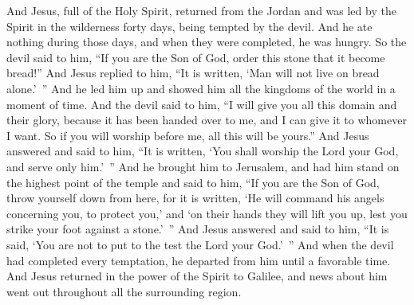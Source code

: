 \begin{biblechapter} %
 And Jesus, full of the Holy Spirit, returned from the Jordan and was led by the Spirit in the wilderness
\verse forty days, being tempted by the devil. And he ate nothing during those days, and when they were completed, he was hungry.
\verse So the devil said to him, “If you are the Son of God, order this stone that it become bread!”
\verse And Jesus replied to him, “It is written, ‘Man will not live on bread alone.’ ”
\verse And he led him up and showed him all the kingdoms of the world in a moment of time.
\verse And the devil said to him, “I will give you all this domain and their glory, because it has been handed over to me, and I can give it to whomever I want.
\verse So if you will worship before me, all this will be yours.”
\verse And Jesus answered and said to him, “It is written, ‘You shall worship the Lord your God, and serve only him.’ ”
\verse And he brought him to Jerusalem, and had him stand on the highest point of the temple and said to him, “If you are the Son of God, throw yourself down from here,
\verse for it is written, ‘He will command his angels concerning you, 
to protect you,’
\verse and ‘on their hands they will lift you up, 
lest you strike your foot against a stone.’ ”
\verse And Jesus answered and said to him, “It is said, ‘You are not to put to the test the Lord your God.’ ”
\verse And when the devil had completed every temptation, he departed from him until a favorable time.
 And Jesus returned in the power of the Spirit to Galilee, and news about him went out throughout all the surrounding region.

\end{biblechapter}
